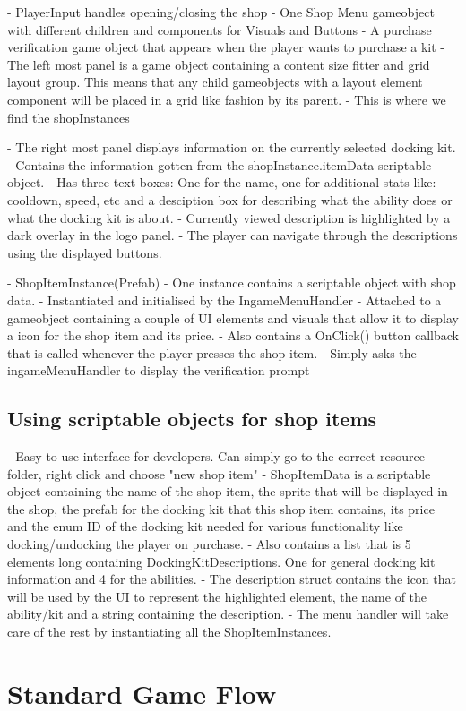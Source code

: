 - PlayerInput handles opening/closing the shop
- One Shop Menu gameobject with different children and components for Visuals and Buttons
        - A purchase verification game object that appears when the player wants to purchase a kit
        - The left most panel is a game object containing a content size fitter and grid layout group. This means that any child gameobjects with a layout element component will be placed in a grid like fashion by its parent.
            - This is where we find the shopInstances
            
        - The right most panel displays information on the currently selected docking kit. 
            - Contains the information gotten from the shopInstance.itemData scriptable object. 
            - Has three text boxes: One for the name, one for additional stats like: cooldown, speed, etc and a desciption box for describing what the ability does or what the docking kit is about. 
            - Currently viewed description is highlighted by a dark overlay in the logo panel. 
            - The player can navigate through the descriptions using the displayed buttons.

- ShopItemInstance(Prefab)
    - One instance contains a scriptable object with shop data.
    - Instantiated and initialised by the IngameMenuHandler
    - Attached to a gameobject containing a couple of UI elements and visuals that allow it to display a icon for the shop item and its price. 
    - Also contains a OnClick() button callback that is called whenever the player presses the shop item.
        - Simply asks the ingameMenuHandler to display the verification prompt

\subsection{Using scriptable objects for shop items}
- Easy to use interface for developers. Can simply go to the correct resource folder, right click and choose "new shop item"
- ShopItemData is a scriptable object containing the name of the shop item, the sprite that will be displayed in the shop, the prefab for the docking kit that this shop item contains, its price and the enum ID of the docking kit needed for various functionality like docking/undocking the player on purchase. 
- Also contains a list that is 5 elements long containing DockingKitDescriptions. One for general docking kit information and 4 for the abilities. 
- The description struct contains the icon that will be used by the UI to represent the highlighted element, the name of the ability/kit and a string containing the description.
- The menu handler will take care of the rest by instantiating all the ShopItemInstances.

\section{Standard Game Flow}
